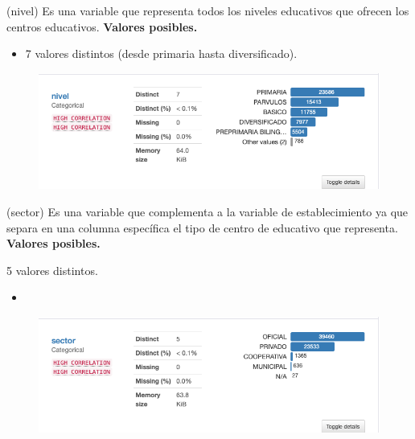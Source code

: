 \begin{variable}(nivel) 
Es una variable que representa todos los niveles educativos que ofrecen los centros educativos.
\bigbreak 
\textbf{Valores posibles.}
\begin{itemize}
	\item 7 valores distintos (desde primaria hasta diversificado). 
\end{itemize}
\begin{figure}[H]
	\centering
	\includegraphics[scale=0.5]{Images/8}
\end{figure}
\end{variable}


\begin{variable}(sector) 
Es una variable que complementa a la variable de establecimiento ya que separa en una columna específica el tipo de centro de educativo que representa.
\bigbreak 
\textbf{Valores posibles.}
\item 5 valores distintos. 
\begin{itemize}
	\item 
\end{itemize}
\begin{figure}[H]
	\centering
	\includegraphics[scale=0.5]{Images/9}
\end{figure}
\end{variable}


